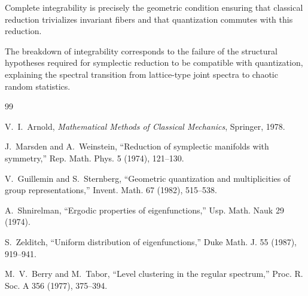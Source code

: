 \documentclass[11pt]{article}
\begin{document}
Complete integrability is precisely the geometric condition ensuring that classical reduction trivializes invariant fibers and that quantization commutes with this reduction.

The breakdown of integrability corresponds to the failure of the structural hypotheses required for symplectic reduction to be compatible with quantization, explaining the spectral transition from lattice-type joint spectra to chaotic random statistics.

\begin{thebibliography}{99}

V.~I.~Arnold,
\emph{Mathematical Methods of Classical Mechanics},
Springer, 1978.

J.~Marsden and A.~Weinstein,
``Reduction of symplectic manifolds with symmetry,''
Rep. Math. Phys. 5 (1974), 121--130.

V.~Guillemin and S.~Sternberg,
``Geometric quantization and multiplicities of group representations,''
Invent. Math. 67 (1982), 515--538.

A.~Shnirelman,
``Ergodic properties of eigenfunctions,''
Usp. Math. Nauk 29 (1974).

S.~Zelditch,
``Uniform distribution of eigenfunctions,''
Duke Math. J. 55 (1987), 919--941.

M.~V.~Berry and M.~Tabor,
``Level clustering in the regular spectrum,''
Proc. R. Soc. A 356 (1977), 375--394.

\end{thebibliography}
\end{document}
